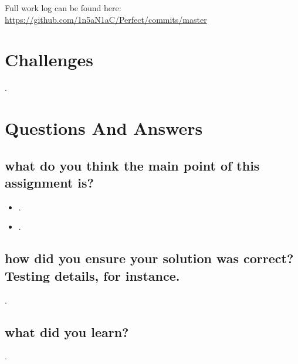 \documentclass[letterpaper,10pt,titlepage]{article}
\begin{document}
Full work log can be found here:
\url{https://github.com/1n5aN1aC/Perfect/commits/master}

\section{Challenges}

.

\section{Questions And Answers}

\subsection{what do you think the main point of this assignment is?}

\begin{itemize}
\item .
\item .
\end{itemize}

\subsection{how did you ensure your solution was correct? Testing details, for instance.}

.

\subsection{what did you learn?}

.
\end{document}
